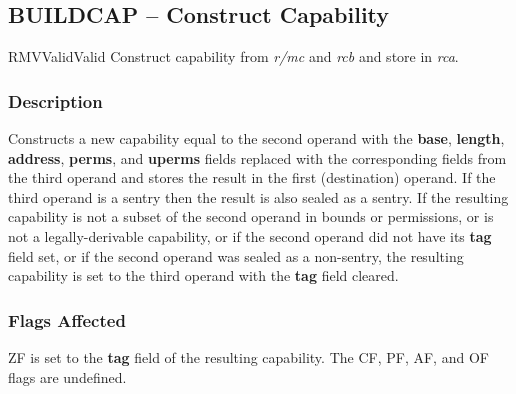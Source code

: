 \clearpage
{}
{}
\subsection*{BUILDCAP -- Construct Capability}

\begin{x86opcodetable}
  {RMV}{Valid}{Valid}
  {Construct capability from \emph{r/mc} and \emph{rcb} and store in
    \emph{rca}.}
\end{x86opcodetable}

\begin{x86opentable}
\end{x86opentable}

\subsubsection*{Description}

Constructs a new capability equal to the second operand with the
\textbf{base}, \textbf{length}, \textbf{address}, \textbf{perms}, and
\textbf{uperms} fields replaced with the corresponding fields from the
third operand and stores the result in the first (destination) operand.
If the third operand is a sentry then the result is also sealed as a
sentry.  If the resulting capability is not a subset of the second
operand in bounds or permissions, or is not a legally-derivable
capability, or if the second operand did not have its \textbf{tag}
field set, or if the second operand was sealed as a non-sentry, the
resulting capability is set to the third operand with the \textbf{tag}
field cleared.

\subsubsection*{Flags Affected}

ZF is set to the \textbf{tag} field of the resulting capability.  The
CF, PF, AF, and OF flags are undefined.
